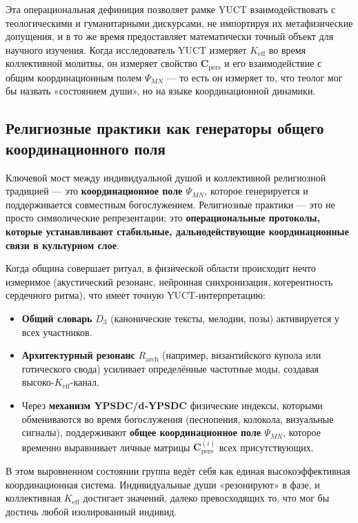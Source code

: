 \documentclass[12pt,a4paper]{article}
\newcommand{\Keff}{K_{\mathrm{eff}}}
\begin{document}
	Эта операциональная дефиниция позволяет рамке YUCT взаимодействовать с теологическими и гуманитарными дискурсами, не импортируя их метафизические допущения, и в то же время предоставляет математически точный объект для научного изучения. Когда исследователь YUCT измеряет \(K_{\mathrm{eff}}\) во время коллективной молитвы, он измеряет свойство \(\mathbf{C}_{\text{pers}}\) и его взаимодействие с общим координационным полем \(\Psi_{MN}\) — то есть он измеряет то, что теолог мог бы назвать «состоянием души», но на языке координационной динамики.
	
	\subsection{Религиозные практики как генераторы общего координационного поля}
	
	Ключевой мост между индивидуальной душой и коллективной религиозной традицией — это \textbf{координационное поле \(\Psi_{MN}\)}, которое генерируется и поддерживается совместным богослужением. Религиозные практики — это не просто символические репрезентации; это \textbf{операциональные протоколы, которые устанавливают стабильные, дальнодействующие координационные связи в культурном слое}.
	
	Когда община совершает ритуал, в физической области происходит нечто измеримое (акустический резонанс, нейронная синхронизация, когерентность сердечного ритма), что имеет точную YUCT-интерпретацию:
	\begin{itemize}
		\item \textbf{Общий словарь} \(D_3\) (канонические тексты, мелодии, позы) активируется у всех участников.
		\item \textbf{Архитектурный резонанс} \(R_{\mathrm{arch}}\) (например, византийского купола или готического свода) усиливает определённые частотные моды, создавая высоко-\(\Keff\)-канал.
		\item Через \textbf{механизм YPSDC/d‑YPSDC} физические индексы, которыми обмениваются во время богослужения (песнопения, колокола, визуальные сигналы), поддерживают \textbf{общее координационное поле \(\Psi_{MN}\)}, которое временно выравнивает личные матрицы \(\mathbf{C}_{\text{pers}}^{(i)}\) всех присутствующих.
	\end{itemize}
	
	В этом выровненном состоянии группа ведёт себя как единая высокоэффективная координационная система. Индивидуальные души «резонируют» в фазе, и коллективная \(K_{\mathrm{eff}}\) достигает значений, далеко превосходящих то, что мог бы достичь любой изолированный индивид.
	
\end{document}
